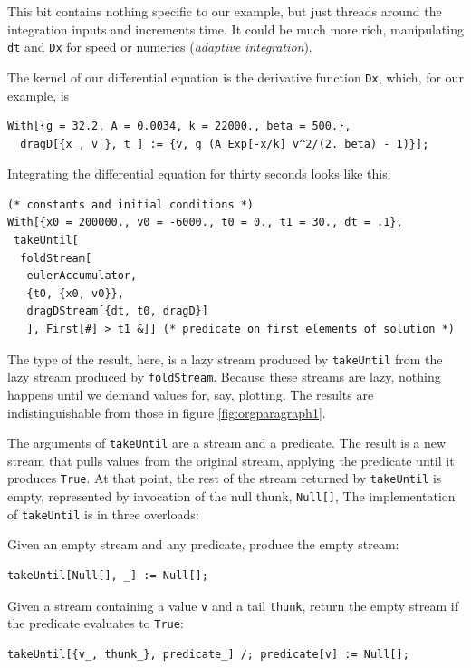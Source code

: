 \documentclass[10pt,oneside,x11names]{article}
\begin{document}
This bit contains nothing specific to our example, but just threads around the
integration inputs and increments time. It could be much more rich,
manipulating \texttt{dt} and \texttt{Dx} for speed or numerics (\emph{adaptive integration}).

The kernel of our differential equation is the derivative function \texttt{Dx}, which,
for our example, is

\begin{verbatim}
With[{g = 32.2, A = 0.0034, k = 22000., beta = 500.},
  dragD[{x_, v_}, t_] := {v, g (A Exp[-x/k] v^2/(2. beta) - 1)}];
\end{verbatim}

\noindent Integrating the differential equation for thirty seconds looks like this:

\begin{verbatim}
(* constants and initial conditions *)
With[{x0 = 200000., v0 = -6000., t0 = 0., t1 = 30., dt = .1},
 takeUntil[
  foldStream[
   eulerAccumulator,
   {t0, {x0, v0}},
   dragDStream[{dt, t0, dragD}]
   ], First[#] > t1 &]] (* predicate on first elements of solution *)
\end{verbatim}

The type of the result, here, is a lazy stream produced by \texttt{takeUntil} from the
lazy stream produced by \texttt{foldStream}. Because these streams are lazy, nothing
happens until we demand values for, say, plotting. The results are
indistinguishable from those in figure \ref{fig:orgparagraph1}. 

The arguments of \texttt{takeUntil} are a stream and a predicate. The result is a new
stream that pulls values from the original stream, applying the predicate until
it produces \texttt{True}. At that point, the rest of the stream returned by
\texttt{takeUntil} is empty, represented by invocation of the null thunk, \texttt{Null[]},
The implementation of \texttt{takeUntil} is in three overloads:

Given an empty stream and any predicate, produce the empty stream:

\begin{verbatim}
takeUntil[Null[], _] := Null[];
\end{verbatim}

Given a stream containing a value \texttt{v} and a tail \texttt{thunk}, return the empty
stream if the predicate evaluates to \texttt{True}:

\begin{verbatim}
takeUntil[{v_, thunk_}, predicate_] /; predicate[v] := Null[];
\end{verbatim}
\end{document}
